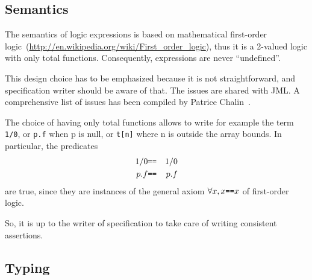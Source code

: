 \documentclass[a4paper,11pt,twoside,openright]{report}
\begin{document}
\subsection{Semantics}
\label{sec:twovaluedlogic}

The semantics of logic expressions is based on
mathematical first-order
logic~(\url{http://en.wikipedia.org/wiki/First_order_logic}), thus it
is a 2-valued logic with only total functions. Consequently,
expressions are never ``undefined''.

This design choice has to be emphasized because it is not
straightforward, and specification writer should be aware of that. The
issues are shared with JML. A comprehensive list of issues has been
compiled by Patrice Chalin~\cite{chalin05ftfjp,chalin07icse}.

The choice of having only total functions allows to write for example
the term \verb|1/0|, or \verb|p.f| when p is null, or \verb|t[n]|
where n is outside the array bounds. In
particular, the predicates
\begin{eqnarray*}
  1/0 &\verb|==|& 1/0 \\\relax
  p.f &\verb|==|& p.f
\end{eqnarray*}
are true, since they are instances of the general axiom $\forall x,
x\verb|==|x$ of first-order logic.

So, it is up to the writer of specification to take care of writing
consistent assertions. 

\subsection{Typing}
\end{document}

